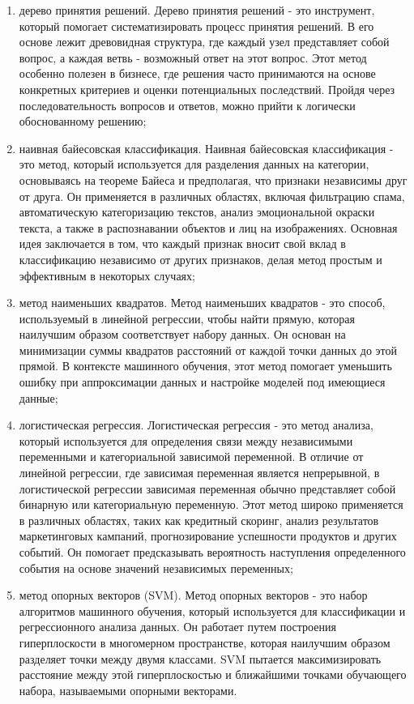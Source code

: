 \begin{enumerate}
	\item дерево принятия решений. Дерево принятия решений -  это инструмент, который помогает систематизировать процесс принятия решений. В его основе лежит древовидная структура, где каждый узел представляет собой вопрос, а каждая ветвь - возможный ответ на этот вопрос. Этот метод особенно полезен в бизнесе, где решения часто принимаются на основе конкретных критериев и оценки потенциальных последствий. Пройдя через последовательность вопросов и ответов, можно прийти к логически обоснованному решению;
	\item наивная байесовская классификация. Наивная байесовская классификация - это метод, который используется для разделения данных на категории, основываясь на теореме Байеса и предполагая, что признаки независимы друг от друга. Он применяется в различных областях, включая фильтрацию спама, автоматическую категоризацию текстов, анализ эмоциональной окраски текста, а также в распознавании объектов и лиц на изображениях. Основная идея заключается в том, что каждый признак вносит свой вклад в классификацию независимо от других признаков, делая метод простым и эффективным в некоторых случаях;
	\item метод наименьших квадратов. Метод наименьших квадратов - это способ, используемый в линейной регрессии, чтобы найти прямую, которая наилучшим образом соответствует набору данных. Он основан на минимизации суммы квадратов расстояний от каждой точки данных до этой прямой. В контексте машинного обучения, этот метод помогает уменьшить ошибку при аппроксимации данных и настройке моделей под имеющиеся данные;
	\item логистическая регрессия. Логистическая регрессия - это метод анализа, который используется для определения связи между независимыми переменными и категориальной зависимой переменной. В отличие от линейной регрессии, где зависимая переменная является непрерывной, в логистической регрессии зависимая переменная обычно представляет собой бинарную или категориальную переменную. Этот метод широко применяется в различных областях, таких как кредитный скоринг, анализ результатов маркетинговых кампаний, прогнозирование успешности продуктов и других событий. Он помогает предсказывать вероятность наступления определенного события на основе значений независимых переменных;
	\item метод опорных векторов (SVM). Метод опорных векторов - это набор алгоритмов машинного обучения, который используется для классификации и регрессионного анализа данных. Он работает путем построения гиперплоскости в многомерном пространстве, которая наилучшим образом разделяет точки между двумя классами. SVM пытается максимизировать расстояние между этой гиперплоскостью и ближайшими точками обучающего набора, называемыми опорными векторами.

\end{enumerate}
